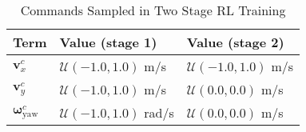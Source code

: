 \begin{table}[t]
    \centering
    \caption{Commands Sampled in Two Stage RL Training}
    \begin{tabular}{lll}
    \toprule[1.0pt]
    \textbf{Term} & \textbf{Value (stage 1)} & \textbf{Value (stage 2)} \\
    
    \midrule[1.pt]
    $\mathbf{v}_x^c$ & $\mathcal{U}(-1.0, 1.0)$ m/s & $\mathcal{U}(-1.0, 1.0)$ m/s \\ [0.2ex]
    $\mathbf{v}_y^c$ & $\mathcal{U}(-1.0, 1.0)$ m/s & $\mathcal{U}(0.0, 0.0)$ m/s \\ [0.2ex]
    $\boldsymbol{\omega}_\text{yaw}^c$ & $\mathcal{U}(-1.0, 1.0)$ rad/s & $\mathcal{U}(0.0, 0.0)$ m/s \\ [0.2ex]    
    \bottomrule[1.0pt]
    \end{tabular}
    \label{tab:command}
\end{table}